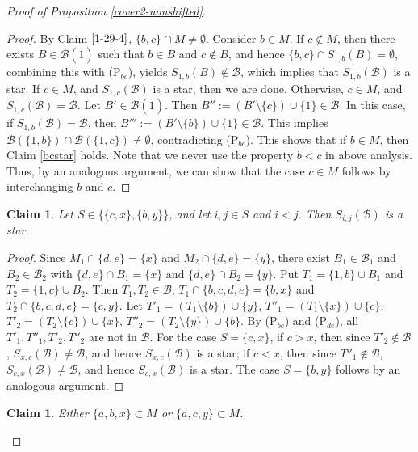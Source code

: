 \documentclass[a4paper,11pt]{article}
\newtheorem{claim}[theorem]{Claim}
\newcommand{\m}{\mathcal}
\begin{document}
\begin{proof}[Proof of Proposition \ref{cover2-nonshifted}]
\begin{proof}
By Claim $\ref{1-29-4}$, $\{b,c\}\cap M\ne \emptyset$. 
Consider $b\in M$.
If $c\not\in M$, then there exists $B\in \m B(\bar 1)$ such that $b\in B$ and $c\not\in B$, and hence $\{b,c\}\cap S_{1,b}(B)=\emptyset$, combining this with (P$_{bc}$), yields $S_{1,b}(B)\not\in \m B$, which implies that $S_{1,b}(\m B)$ is a star. 
If $c\in M$, and $S_{1,c}(\m B)$ is a star, then we are done.
Otherwise, $c\in M$, and $S_{1,c}(\m B)=\m B$. 
Let $B'\in \m B(\bar1)$. Then $B'':=(B'\setminus \{c\})\cup \{1\}\in \m B$.
In this case, if $S_{1,b}(\m B)=\m B$, then $B''':=(B'\setminus \{b\})\cup \{1\}\in \m B$. This implies $\m B(\{1,b\})\cap \m B(\{1,c\})\ne \emptyset$, contradicting (P$_{bc}$). This shows that if $b\in M$, then Claim \ref{bcstar} holds. Note that we never use the property $b<c$ in above analysis. Thus, by an analogous argument, we can show that the case $c\in M$ follows by interchanging $b$ and $c$.
\end{proof}





\begin{claim}\label{2-16-1}
Let $S\in \{\{c,x\}, \{b,y\}\}$, and let $i,j\in S$ and $i<j$. Then $S_{i,j}(\m B)$ is a star.
\end{claim}

\begin{proof}
Since $M_1\cap \{d,e\}=\{x\}$ and $M_2\cap \{d,e\}=\{y\}$, 
there exist $B_1\in \m B_1$ and $B_2\in \m B_2$ with $\{d,e\}\cap B_1=\{x\}$ and $\{d,e\}\cap B_2=\{y\}$. 
Put $T_1=\{1,b\}\cup B_1$ and $T_2=\{1,c\}\cup B_2$. 
Then $T_1, T_2 \in \m B$, $T_1\cap \{b,c,d,e\}=\{b,x\}$ and  $T_2\cap \{b,c,d,e\}=\{c,y\}$. 
Let $T'_1=(T_1\setminus \{b\})\cup \{y\}$, $T''_1=(T_1\setminus \{x\})\cup \{c\}$, $T'_2=(T_2\setminus \{c\})\cup \{x\}$, $T''_2=(T_2\setminus \{y\})\cup \{b\}$. 
By (P$_{bc}$) and (P$_{de}$), all $T'_1, T''_1, T'_2, T''_2$ are not in $\m B$. 
For the case $S=\{c,x\}$, if $c>x$, then since $T'_2\not\in \m B$, $S_{x,c}(\m B)\ne \m B$, and hence  $S_{x,c}(\m B)$ is a star; if $c<x$, then since $T''_1\not\in \m B$, $S_{c,x}(\m B)\ne \m B$, and hence  $S_{c,x}(\m B)$ is a star. The case $S=\{b,y\}$ follows by an analogous argument. 
\end{proof}


\begin{claim}\label{2-10-2}
Either $\{a,b,x\}\subset M$ or $\{a,c,y\}\subset M$.
\end{claim}


\end{proof}
\end{document}
